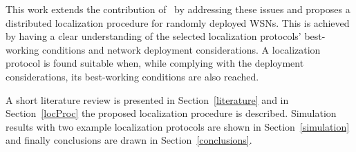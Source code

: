 
This work extends the contribution of~\cite{composability} by addressing these issues and proposes a distributed localization procedure for randomly deployed WSNs. This is achieved by having a clear understanding of the selected localization protocols' best-working conditions and network deployment considerations. A localization protocol is found suitable when, while complying with the deployment considerations, its best-working conditions are also reached.

A short literature review is presented in Section~\ref{literature} and in Section~\ref{locProc} the proposed localization procedure is described. Simulation results with two example localization protocols are shown in Section~\ref{simulation} and finally conclusions are drawn in Section~\ref{conclusions}.